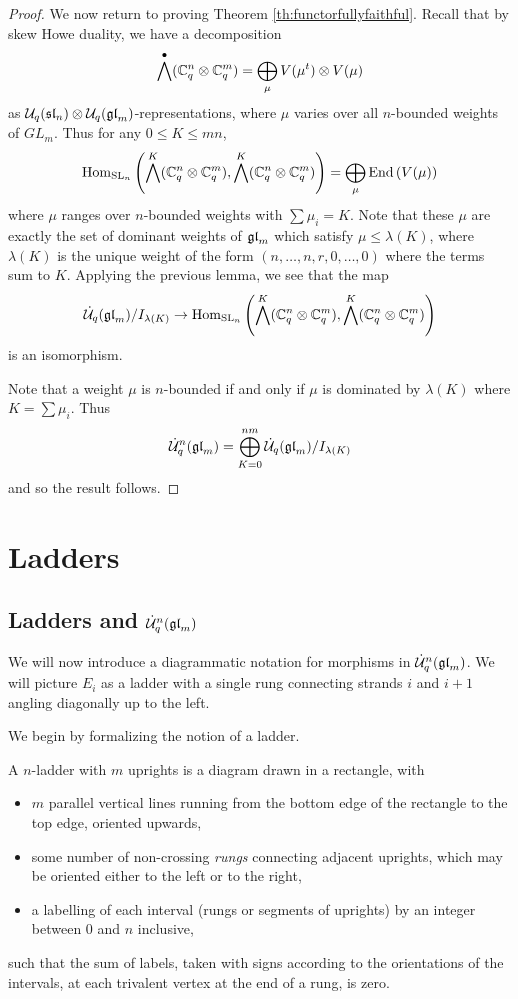 \documentclass[11pt,leqno]{article}
\begin{document}
\begin{proof}
We now return to proving Theorem \ref{th:functorfullyfaithful}. Recall that by skew Howe duality, we have a decomposition
$$ \bigwedge^\bullet ({\mathbb{C}}_q^n \otimes {\mathbb{C}}_q^m) = \bigoplus_{\mu} V(\mu^t) \otimes V(\mu) $$
as $\mathcal{U}_q({\mathfrak{sl}}_n) \otimes \mathcal{U}_q({\mathfrak{gl}}_m)$-representations, where $\mu$ varies over all $n$-bounded weights of $ GL_m$. Thus for any $ 0 \le K \le mn $,
$$ \operatorname{Hom}_{{\rm{SL}}_n} \left(\bigwedge^K({\mathbb{C}}_q^n \otimes {\mathbb{C}}_q^m), \bigwedge^K({\mathbb{C}}_q^n \otimes {\mathbb{C}}_q^m)\right) = \bigoplus_{\mu} \operatorname{End}\left(V(\mu)\right) $$
where $ \mu $ ranges over $ n$-bounded weights with $ \sum \mu_i = K $.  Note that these $\mu $ are exactly the set of dominant weights of $ {\mathfrak{gl}}_m $ which satisfy $ \mu \le \lambda(K) $, where $ \lambda(K) $ is the unique weight of the form $(n, \dots, n, r, 0, \dots, 0) $ where the terms sum to $K$.  Applying the previous lemma, we see that the map
$$ \dot{{\mathcal{U}}}_q({\mathfrak{gl}}_m)/I_{\lambda(K)} \rightarrow \operatorname{Hom}_{{\rm{SL}}_n} \left(\bigwedge^K({\mathbb{C}}_q^n \otimes {\mathbb{C}}_q^m), \bigwedge^K({\mathbb{C}}_q^n \otimes {\mathbb{C}}_q^m)\right) $$
is an isomorphism.

Note that a weight $ \mu $ is $n$-bounded if and only if $ \mu $ is dominated by $ \lambda(K) $ where $ K = \sum \mu_i $. Thus
$$
\dot{{\mathcal{U}}}_q^n({\mathfrak{gl}}_m) = \bigoplus_{K=0}^{nm} \dot{{\mathcal{U}}}_q({\mathfrak{gl}}_m)/I_{\lambda(K)}
$$
and so the result follows.
\end{proof}

\section{Ladders}
\label{sec:ladders}

\subsection{Ladders and $\dot{{\mathcal{U}}}_q^n({\mathfrak{gl}}_m)$ }
We will now introduce a diagrammatic notation for morphisms in $ \dot{{\mathcal{U}}}_q^n({\mathfrak{gl}}_m)$.  We will picture $E_i $ as a ladder with a single rung connecting strands $ i $ and $ i+1 $ angling  diagonally up to the left.

We begin by formalizing the notion of a ladder.
\begin{defn}
A $n$-ladder with $m$ uprights is a diagram drawn in a rectangle, with
\begin{itemize}
\item $m$ parallel vertical lines running from the bottom edge of the rectangle to the top edge, oriented upwards,
\item some number of non-crossing \emph{rungs} connecting adjacent uprights, which may be oriented either to the left or to the right,
\item a labelling of each interval (rungs or segments of uprights) by an integer between $0$ and $n$ inclusive,
\end{itemize}
such that the sum of labels, taken with signs according to the orientations of the intervals, at each trivalent vertex at the end of a rung, is zero.
\end{defn}
\end{document}
